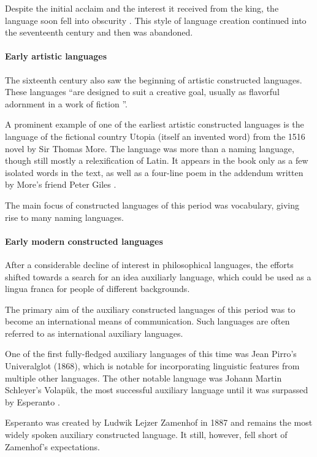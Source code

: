 \documentclass[14pt, a4paper]{extreport}
\begin{document}
Despite the initial acclaim and the interest it received from the king, the language soon fell into obscurity \parencite[25]{okrent}. This style of language creation continued into the seventeenth century and then was abandoned.
        \paragraph{Early artistic languages}
The sixteenth century also saw the beginning of artistic constructed languages. These languages ``are designed to suit a creative goal, usually as flavorful adornment in a work of fiction \parencite{sanders}''.

A prominent example of one of the earliest artistic constructed languages is the language of the fictional country Utopia (itself an invented word) from the 1516 novel by Sir Thomas More. The language was more than a naming language, though still mostly a relexification of Latin. It appears in the book only as a few isolated words in the text, as well as a four-line poem in the addendum written by More's friend Peter Giles \parencite{sanders}.

The main focus of constructed languages of this period was vocabulary, giving rise to many naming languages.
        \paragraph{Early modern constructed languages}
After a considerable decline of interest in philosophical languages, the efforts shifted towards a search for an idea auxiliarly language, which could be used as a lingua franca for people of different backgrounds.

The primary aim of the auxiliary constructed languages of this period was to become an international means of communication. Such languages are often referred to as international auxiliary languages.

One of the first fully-fledged auxiliary languages of this time was Jean Pirro's Univeralglot (1868), which is notable for incorporating linguistic features from multiple other languages. The other notable language was Johann Martin Schleyer's Volapük, the most successful auxiliary language until it was surpassed by Esperanto \parencite{sanders}.

Esperanto was created by Ludwik Lejzer Zamenhof in 1887 and remains the most widely spoken auxiliary constructed language. It still, however, fell short of Zamenhof's expectations.
\end{document}
